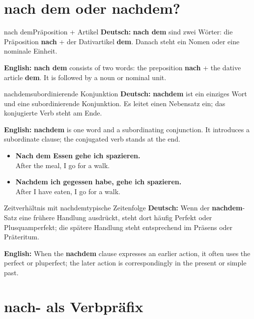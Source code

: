 \documentclass[a4paper,11pt]{article}
\newcommand{\GermanText}[1]{\textbf{Deutsch: }#1\par}
\newcommand{\EnglishText}[1]{{\small\color{SoftGray}\textbf{English: }#1\par}}
\newcommand{\ExampleItem}[2]{\item \textbf{#1}\\{\small\color{SoftGray}#2}}
\begin{document}
    \section{nach dem oder nachdem?}

        \begin{grammarentry}{nach dem}{Präposition + Artikel}
            \GermanText{\textbf{nach dem} sind zwei Wörter: die Präposition \textbf{nach} + der Dativartikel \textbf{dem}. Danach steht ein Nomen oder eine nominale Einheit.}
            \EnglishText{\textbf{nach dem} consists of two words: the preposition \textbf{nach} + the dative article \textbf{dem}. It is followed by a noun or nominal unit.}
        \end{grammarentry}

        \begin{grammarentry}{nachdem}{subordinierende Konjunktion}
            \GermanText{\textbf{nachdem} ist ein einziges Wort und eine subordinierende Konjunktion. Es leitet einen Nebensatz ein; das konjugierte Verb steht am Ende.}
            \EnglishText{\textbf{nachdem} is one word and a subordinating conjunction. It introduces a subordinate clause; the conjugated verb stands at the end.}
        \end{grammarentry}

        \begin{exbox}
            \begin{itemize}
                \ExampleItem{Nach dem Essen gehe ich spazieren.}{After the meal, I go for a walk.}
                \ExampleItem{Nachdem ich gegessen habe, gehe ich spazieren.}{After I have eaten, I go for a walk.}
            \end{itemize}
        \end{exbox}

        \begin{grammarentry}{Zeitverhältnis mit nachdem}{typische Zeitenfolge}
            \GermanText{Wenn der \textbf{nachdem}-Satz eine frühere Handlung ausdrückt, steht dort häufig Perfekt oder Plusquamperfekt; die spätere Handlung steht entsprechend im Präsens oder Präteritum.}
            \EnglishText{When the \textbf{nachdem} clause expresses an earlier action, it often uses the perfect or pluperfect; the later action is correspondingly in the present or simple past.}
        \end{grammarentry}


    \section{nach- als Verbpräfix}
\end{document}
